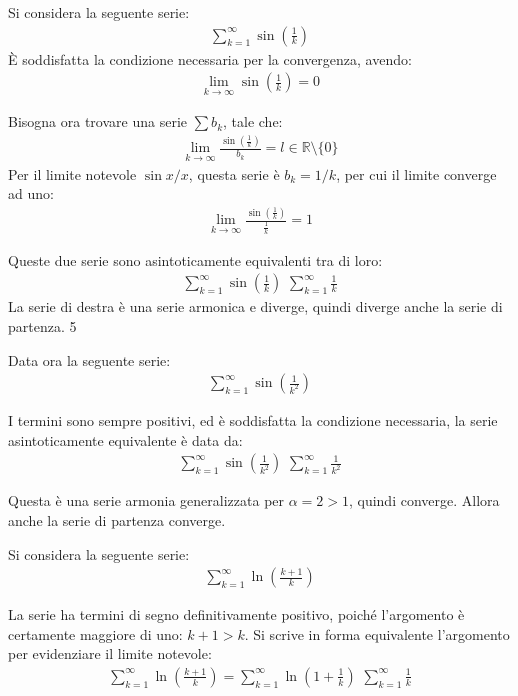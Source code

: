 \documentclass{article}
\numberwithin{equation}{subsection}
\begin{document}
Si considera la seguente serie:
\begin{gather*}
    \displaystyle\sum_{k=1}^\infty\sin\left(\frac{1}{k}\right)
\end{gather*}
È soddisfatta la condizione necessaria per la convergenza, avendo:
\begin{gather*}
    \displaystyle\lim_{k\to\infty}\sin\left(\frac{1}{k}\right)=0
\end{gather*}

Bisogna ora trovare una serie $\sum b_k$, tale che:
\begin{gather*}
    \displaystyle\lim_{k\to\infty}\frac{\sin\left(\frac{1}{k}\right)}{b_k}=l\in\mathbb{R}\setminus\{0\}
\end{gather*}
Per il limite notevole $\sin x/x$, questa serie è $b_k=1/k$, per cui il limite converge ad uno:
\begin{gather*}
    \displaystyle\lim_{k\to\infty}\frac{\sin\left(\frac{1}{k}\right)}{\frac{1}{k}}=1
\end{gather*}

Queste due serie sono asintoticamente equivalenti tra di loro:
\begin{gather*}
    \displaystyle\sum_{k=1}^\infty\sin\left(\frac{1}{k}\right)\mbox{~}\sum_{k=1}^\infty\frac{1}{k}
\end{gather*}
La serie di destra è una serie armonica e diverge, quindi diverge anche la serie di partenza. 5

Data ora la seguente serie:
\begin{gather*}
    \displaystyle\sum_{k=1}^\infty\sin\left(\frac{1}{k^2}\right)
\end{gather*}

I termini sono sempre positivi, ed è soddisfatta la condizione necessaria, la serie asintoticamente equivalente è data da:
\begin{gather*}
    \displaystyle\sum_{k=1}^\infty\sin\left(\frac{1}{k^2}\right)\mbox{~}\displaystyle\sum_{k=1}^\infty\frac{1}{k^2}
\end{gather*}

Questa è una serie armonia generalizzata per $\alpha=2>1$, quindi converge. Allora anche la serie di partenza converge.  


Si considera la seguente serie:
\begin{gather*}
    \displaystyle\sum_{k=1}^\infty\ln\left(\frac{k+1}{k}\right)
\end{gather*}

La serie ha termini di segno definitivamente positivo, poiché l'argomento è certamente maggiore di uno: $k+1>k$. Si scrive in forma equivalente l'argomento per evidenziare il limite notevole:
\begin{gather*}
    \displaystyle\sum_{k=1}^\infty\ln\left(\frac{k+1}{k}\right)=
    \displaystyle\sum_{k=1}^\infty\ln\left(1+\frac{1}{k}\right)\mbox{~}\sum_{k=1}^\infty\frac{1}{k}
\end{gather*}
\end{document}
